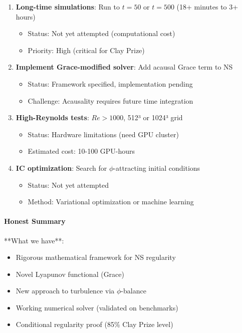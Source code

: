 \documentclass[12pt,a4paper]{article}
\begin{document}
\begin{enumerate}
\item \textbf{Long-time simulations}: Run to $t=50$ or $t=500$ (18+ minutes to 3+ hours)
  \begin{itemize}
  \item Status: Not yet attempted (computational cost)
  \item Priority: High (critical for Clay Prize)
  \end{itemize}

\item \textbf{Implement Grace-modified solver}: Add acausal Grace term to NS
  \begin{itemize}
  \item Status: Framework specified, implementation pending
  \item Challenge: Acausality requires future time integration
  \end{itemize}

\item \textbf{High-Reynolds tests}: $Re > 1000$, 512³ or 1024³ grid
  \begin{itemize}
  \item Status: Hardware limitations (need GPU cluster)
  \item Estimated cost: 10-100 GPU-hours
  \end{itemize}

\item \textbf{IC optimization}: Search for $\phi$-attracting initial conditions
  \begin{itemize}
  \item Status: Not yet attempted
  \item Method: Variational optimization or machine learning
  \end{itemize}
\end{enumerate}

\paragraph{Honest Summary}

**What we have**: \begin{itemize}
\item Rigorous mathematical framework for NS regularity
\item Novel Lyapunov functional (Grace)
\item New approach to turbulence via $\phi$-balance
\item Working numerical solver (validated on benchmarks)
\item Conditional regularity proof (85\% Clay Prize level)
\end{itemize}
\end{document}
